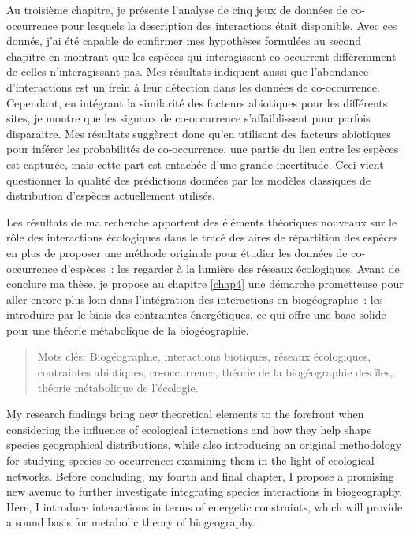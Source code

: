 Au troisième chapitre, je présente l'analyse de cinq jeux de données de
co-occurrence pour lesquels la description des interactions était
disponible. Avec ces donnés, j'ai été capable de confirmer mes
hypothèses formulées au second chapitre en montrant que les espèces qui
interagissent co-occurrent différemment de celles n'interagissant pas.
Mes résultats indiquent aussi que l'abondance d'interactions est un
frein à leur détection dans les données de co-occurrence. Cependant, en
intégrant la similarité des facteurs abiotiques pour les différents
sites, je montre que les signaux de co-occurrence s'affaiblissent pour
parfois disparaitre. Mes résultats suggèrent donc qu'en utilisant des
facteurs abiotiques pour inférer les probabilités de co-occurrence, une
partie du lien entre les espèces est capturée, mais cette part est
entachée d'une grande incertitude. Ceci vient questionner la qualité des
prédictions données par les modèles classiques de distribution d'espèces
actuellement utilisés.

Les résultats de ma recherche apportent des éléments théoriques nouveaux
sur le rôle des interactions écologiques dans le tracé des aires de
répartition des espèces en plus de proposer une méthode originale pour
étudier les données de co-occurrence d'espèces~: les regarder à la
lumière des réseaux écologiques. Avant de conclure ma thèse, je propose
au chapitre \ref{chap4} une démarche prometteuse pour aller encore plus
loin dans l'intégration des interactions en biogéographie~: les
introduire par le biais des contraintes énergétiques, ce qui offre une
base solide pour une théorie métabolique de la biogéographie.

\begin{quote}
Mots clés: Biogéographie, interactions biotiques, réseaux écologiques,
contraintes abiotiques, co-occurrence, théorie de la biogéographie des
îles, théorie métabolique de l'écologie.
\end{quote}

My research findings bring new theoretical elements to the forefront
when considering the influence of ecological interactions and how they
help shape species geographical distributions, while also introducing an
original methodology for studying species co-occurrence: examining them
in the light of ecological networks. Before concluding, my fourth and
final chapter, I propose a promising new avenue to further investigate
integrating species interactions in biogeography. Here, I introduce
interactions in terms of energetic constraints, which will provide a
sound basis for metabolic theory of biogeography.
